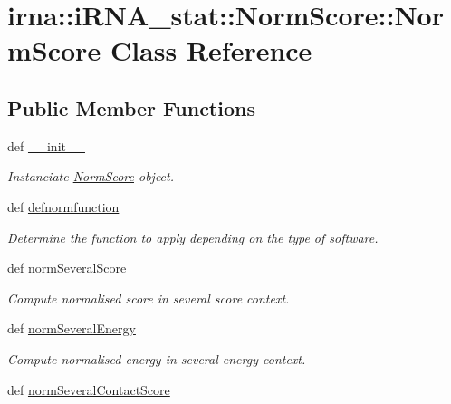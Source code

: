 \hypertarget{classirna_1_1iRNA__stat_1_1NormScore_1_1NormScore}{
\section{irna\-:\-:i\-R\-N\-A\-\_\-stat\-:\-:\-Norm\-Score\-:\-:\-Norm\-Score \-Class \-Reference}
\label{classirna_1_1iRNA__stat_1_1NormScore_1_1NormScore}
}
\subsection*{\-Public \-Member \-Functions}
\begin{DoxyCompactItemize}
\item 
def \hyperlink{classirna_1_1iRNA__stat_1_1NormScore_1_1NormScore_aeb29ccbab639c9e727672494f2624040}{\-\_\-\-\_\-init\-\_\-\-\_\-}
\begin{DoxyCompactList}\small\item\em \-Instanciate \hyperlink{classirna_1_1iRNA__stat_1_1NormScore_1_1NormScore}{\-Norm\-Score} object. \end{DoxyCompactList}\item 
def \hyperlink{classirna_1_1iRNA__stat_1_1NormScore_1_1NormScore_aef788b6584bed1b5a39e3ae47ce0d7b2}{defnormfunction}
\begin{DoxyCompactList}\small\item\em \-Determine the function to apply depending on the type of software. \end{DoxyCompactList}\item 
def \hyperlink{classirna_1_1iRNA__stat_1_1NormScore_1_1NormScore_ace6eafcd46cbc25f14bb1e31d834cc76}{norm\-Several\-Score}
\begin{DoxyCompactList}\small\item\em \-Compute normalised score in several score context. \end{DoxyCompactList}\item 
def \hyperlink{classirna_1_1iRNA__stat_1_1NormScore_1_1NormScore_a875fa6ded3fa42599cd30d5a219937d3}{norm\-Several\-Energy}
\begin{DoxyCompactList}\small\item\em \-Compute normalised energy in several energy context. \end{DoxyCompactList}\item 
def \hyperlink{classirna_1_1iRNA__stat_1_1NormScore_1_1NormScore_a07c030436ea66e23cb0f5eb6565c40bf}{norm\-Several\-Contact\-Score}

\end{DoxyCompactItemize}
